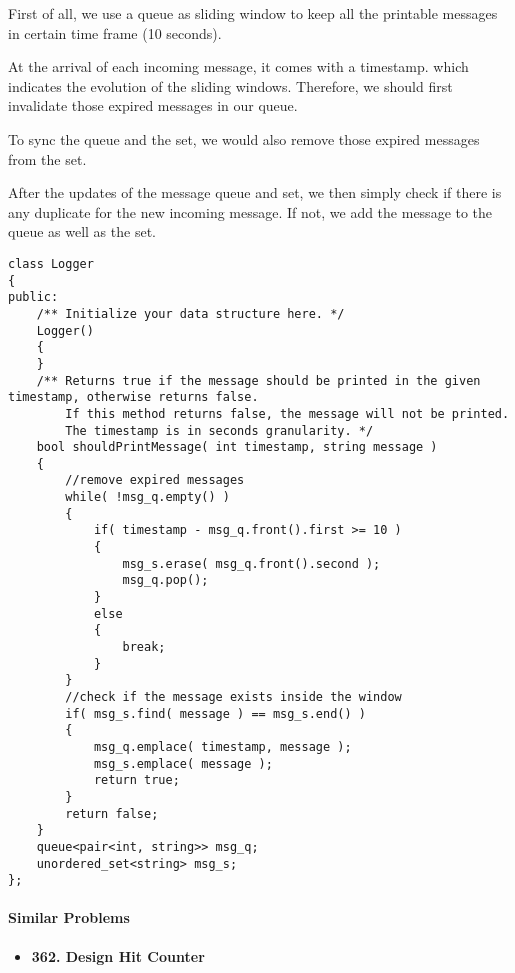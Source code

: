 First of all, we use a queue as sliding window to keep all the printable messages in certain time frame (10 seconds).

At the arrival of each incoming message, it comes with a timestamp. which indicates the evolution of the sliding windows. Therefore, we should first invalidate those expired messages in our queue.

To sync the queue and the set,  we would also remove those expired messages from the set.

After the updates of the message queue and set, we then simply check if there is any duplicate for the new incoming message. If not, we add the message to the queue as well as the set.

\setcounter{lstlisting}{0}
\begin{lstlisting}[style=customc, caption={Sliding Window}]
class Logger
{
public:
    /** Initialize your data structure here. */
    Logger()
    {
    }
    /** Returns true if the message should be printed in the given timestamp, otherwise returns false.
        If this method returns false, the message will not be printed.
        The timestamp is in seconds granularity. */
    bool shouldPrintMessage( int timestamp, string message )
    {
        //remove expired messages
        while( !msg_q.empty() )
        {
            if( timestamp - msg_q.front().first >= 10 )
            {
                msg_s.erase( msg_q.front().second );
                msg_q.pop();
            }
            else
            {
                break;
            }
        }
        //check if the message exists inside the window
        if( msg_s.find( message ) == msg_s.end() )
        {
            msg_q.emplace( timestamp, message );
            msg_s.emplace( message );
            return true;
        }
        return false;
    }
    queue<pair<int, string>> msg_q;
    unordered_set<string> msg_s;
};
\end{lstlisting}

\paragraph{Similar Problems}
\begin{itemize}
\item \textbf{362. Design Hit Counter}
\end{itemize}

